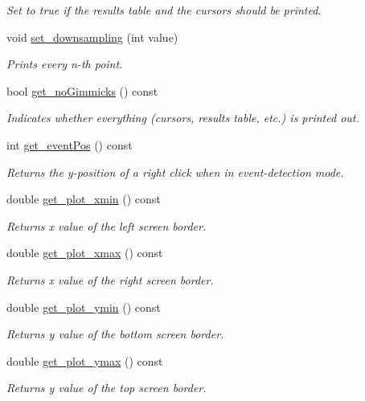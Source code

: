 \begin{DoxyCompactItemize}
\begin{DoxyCompactList}\small\item\em Set to true if the results table and the cursors should be printed. \item\end{DoxyCompactList}\item 
void \hyperlink{classwxStfGraph_ab45c79dfdb70f26741223f1e9f73ed89}{set\_\-downsampling} (int value)
\begin{DoxyCompactList}\small\item\em Prints every n-\/th point. \item\end{DoxyCompactList}\item 
bool \hyperlink{classwxStfGraph_a66565bf1b8c8735ee244201dea518621}{get\_\-noGimmicks} () const 
\begin{DoxyCompactList}\small\item\em Indicates whether everything (cursors, results table, etc.) is printed out. \item\end{DoxyCompactList}\item 
int \hyperlink{classwxStfGraph_a66d4bb8513f5b223478cc70355730b21}{get\_\-eventPos} () const 
\begin{DoxyCompactList}\small\item\em Returns the y-\/position of a right click when in event-\/detection mode. \item\end{DoxyCompactList}\item 
double \hyperlink{classwxStfGraph_a1432014f4eef0a12a075356c3dfcffe9}{get\_\-plot\_\-xmin} () const 
\begin{DoxyCompactList}\small\item\em Returns x value of the left screen border. \item\end{DoxyCompactList}\item 
double \hyperlink{classwxStfGraph_a87e9ef1ebb50844b8094b77edff77768}{get\_\-plot\_\-xmax} () const 
\begin{DoxyCompactList}\small\item\em Returns x value of the right screen border. \item\end{DoxyCompactList}\item 
double \hyperlink{classwxStfGraph_aa1aec4dbf01c1b1325b49d6d48cdaa14}{get\_\-plot\_\-ymin} () const 
\begin{DoxyCompactList}\small\item\em Returns y value of the bottom screen border. \item\end{DoxyCompactList}\item 
double \hyperlink{classwxStfGraph_ae9bb359dc6fd0a8baa36fd347f82dd1a}{get\_\-plot\_\-ymax} () const 
\begin{DoxyCompactList}\small\item\em Returns y value of the top screen border. \item\end{DoxyCompactList}\end{DoxyCompactItemize}
